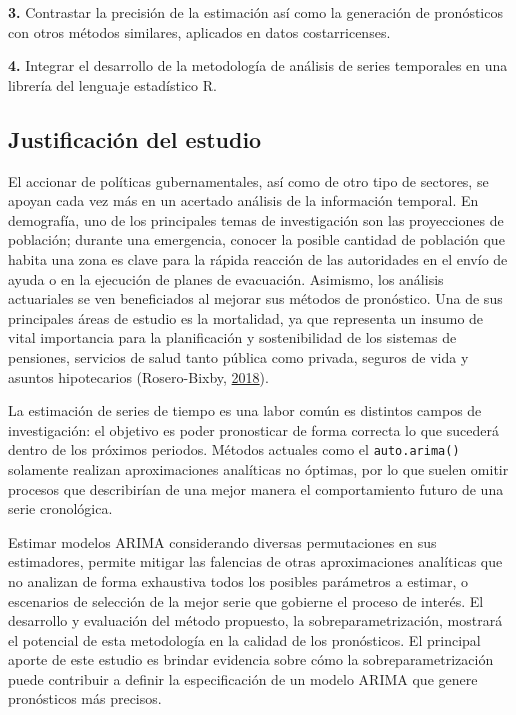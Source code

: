 \documentclass[
]{article}
\begin{document}
\textbf{3.} Contrastar la precisión de la estimación así como la
generación de pronósticos con otros métodos similares, aplicados en
datos costarricenses.

\textbf{4.} Integrar el desarrollo de la metodología de análisis de
series temporales en una librería del lenguaje estadístico R.

\subsection{Justificación del estudio}

El accionar de políticas gubernamentales, así como de otro tipo de
sectores, se apoyan cada vez más en un acertado análisis de la
información temporal. En demografía, uno de los principales temas de
investigación son las proyecciones de población; durante una emergencia,
conocer la posible cantidad de población que habita una zona es clave
para la rápida reacción de las autoridades en el envío de ayuda o en la
ejecución de planes de evacuación. Asimismo, los análisis actuariales se
ven beneficiados al mejorar sus métodos de pronóstico. Una de sus
principales áreas de estudio es la mortalidad, ya que representa un
insumo de vital importancia para la planificación y sostenibilidad de
los sistemas de pensiones, servicios de salud tanto pública como
privada, seguros de vida y asuntos hipotecarios (Rosero-Bixby,
\protect\hyperlink{ref-supenprodc}{2018}).

La estimación de series de tiempo es una labor común es distintos campos
de investigación: el objetivo es poder pronosticar de forma correcta lo
que sucederá dentro de los próximos periodos. Métodos actuales como el
\texttt{auto.arima()} solamente realizan aproximaciones analíticas no
óptimas, por lo que suelen omitir procesos que describirían de una mejor
manera el comportamiento futuro de una serie cronológica.

Estimar modelos ARIMA considerando diversas permutaciones en sus
estimadores, permite mitigar las falencias de otras aproximaciones
analíticas que no analizan de forma exhaustiva todos los posibles
parámetros a estimar, o escenarios de selección de la mejor serie que
gobierne el proceso de interés. El desarrollo y evaluación del método
propuesto, la sobreparametrización, mostrará el potencial de esta
metodología en la calidad de los pronósticos. El principal aporte de
este estudio es brindar evidencia sobre cómo la sobreparametrización
puede contribuir a definir la especificación de un modelo ARIMA que
genere pronósticos más precisos.
\end{document}
